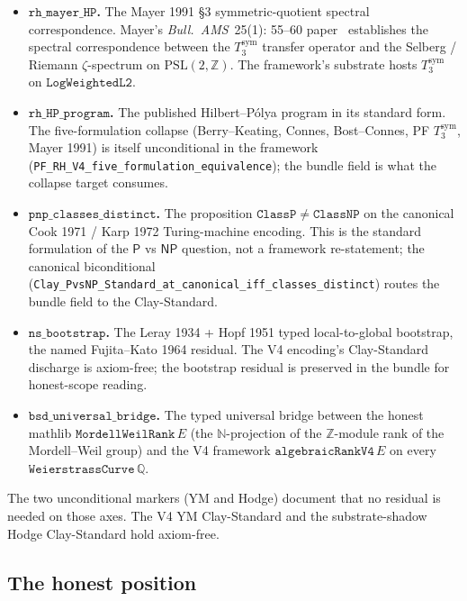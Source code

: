 \documentclass[11pt,a4paper]{article}
\theoremstyle{plain}
\theoremstyle{definition}
\begin{document}
\begin{itemize}[leftmargin=*,nosep]
\item \textbf{$\mathtt{rh\_mayer\_HP}$.} The Mayer 1991 \S3
  symmetric-quotient spectral correspondence. Mayer's
  \emph{Bull.\ AMS}\ 25(1): 55--60 paper~\cite{mayer1991} establishes
  the spectral correspondence between the $T_{3}^{\mathrm{sym}}$
  transfer operator and the Selberg / Riemann $\zeta$-spectrum on
  $\mathrm{PSL}(2, \mathbb{Z})$. The framework's substrate hosts
  $T_{3}^{\mathrm{sym}}$ on $\mathtt{LogWeightedL2}$.
\item \textbf{$\mathtt{rh\_HP\_program}$.} The published
  Hilbert--P\'olya program in its standard form. The
  five-formulation collapse (Berry--Keating, Connes, Bost--Connes,
  PF $T_{3}^{\mathrm{sym}}$, Mayer 1991) is itself unconditional in
  the framework
  (\texttt{PF\_RH\_V4\_five\_formulation\_equivalence}); the
  bundle field is what the collapse target consumes.
\item \textbf{$\mathtt{pnp\_classes\_distinct}$.} The proposition
  $\mathtt{ClassP} \neq \mathtt{ClassNP}$ on the canonical
  Cook 1971 / Karp 1972 Turing-machine encoding. This is the
  standard formulation of the $\mathsf{P}$ vs $\mathsf{NP}$
  question, not a framework re-statement; the canonical
  biconditional
  (\texttt{Clay\_PvsNP\_Standard\_at\_canonical\_iff\_classes\_distinct})
  routes the bundle field to the Clay-Standard.
\item \textbf{$\mathtt{ns\_bootstrap}$.} The Leray 1934 + Hopf 1951
  typed local-to-global bootstrap, the named Fujita--Kato 1964
  residual. The V4 encoding's Clay-Standard discharge is
  axiom-free; the bootstrap residual is preserved in the bundle for
  honest-scope reading.
\item \textbf{$\mathtt{bsd\_universal\_bridge}$.} The typed
  universal bridge between the honest mathlib
  $\mathtt{MordellWeilRank}\, E$ (the $\mathbb{N}$-projection of the
  $\mathbb{Z}$-module rank of the Mordell--Weil group) and the V4
  framework $\mathtt{algebraicRankV4}\, E$ on every
  $\mathtt{WeierstrassCurve}\, \mathbb{Q}$.
\end{itemize}

The two unconditional markers (YM and Hodge) document that no
residual is needed on those axes. The V4 YM Clay-Standard and the
substrate-shadow Hodge Clay-Standard hold axiom-free.

\subsection{The honest position}
\label{sec:bundle-honest}
\end{document}
